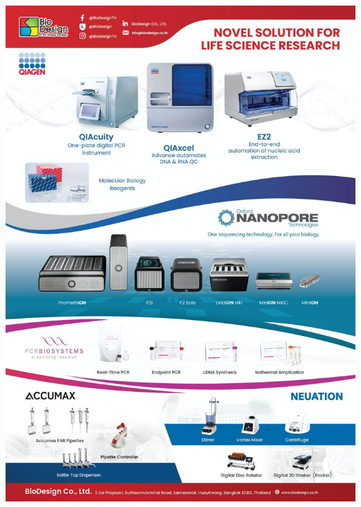 \documentclass[
]{article}
\begin{document}
\href{https://www.biodesign.co.th/}{\includegraphics{./Page/elements/img/Exhibitors/Biodesign.jpeg}}
\end{document}
